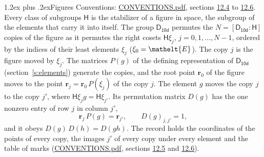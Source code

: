 \documentclass[10pt,a4paper]{article}
\makeatletter
\renewcommand\section{\@startsection{section}{1}{\z@}{-3ex plus -1ex minus -.2ex}%
  {1.2ex plus .2ex}{\normalfont\large\sffamily\bfseries\color{parttitle}}}
\numberwithin{equation}{section}
\newcommand{\eltfont}[1]{{\let\sigma\eltsigma\mathelt{#1}}}
\newcommand{\grp}[1]{\mathsf{#1}}
\newcommand{\cls}[1]{\eltfont{#1}}
\newcommand{\pointr}{\mathbf{r}}
\makeatother
\begin{document}
\section{Figures}\label{s:permutation}
Conventions: \href{../../CONVENTIONS.pdf}{CONVENTIONS.pdf}, sections \href{../../CONVENTIONS.pdf\#conv.12.4}{12.4} to \href{../../CONVENTIONS.pdf\#conv.12.6}{12.6}.
Every class of subgroups $\grp{H}$ is the stabilizer of a figure in space, the subgroup of the elements that carry it into itself. \label{n:local.orbit.size}\label{n:element.coset.least}\label{n:index.coset}The group $\grp{D_{10d}}$ permutes the $N = [\grp{D_{10d}} : \grp{H}]$ copies of the figure as it permutes the right cosets $\grp{H}\xi_j$, $j = 0, 1, \dots, N - 1$, ordered by the indices of their least elements $\xi_j$ ($\xi_0 = \cls{E}$). The copy $j$ is the figure moved by $\xi_j$. The matrices $P(g)$ of the defining representation of $\grp{D_{10d}}$ (section~\ref{s:elements}) generate the copies, and the root point $\pointr_0$ of the figure moves to the point $\pointr_j = \pointr_0\, P(\xi_j)$ of the copy $j$. \label{n:local.coset.image}The element $g$ moves the copy $j$ to the copy $j'$, where $\grp{H}\xi_j g = \grp{H}\xi_{j'}$. \label{n:local.matrix.permutation}Its permutation matrix $D(g)$ has the one nonzero entry of row $j$ in column $j'$,
\begin{equation}\label{e:perm.matrix}\pointr_j\, P(g) = \pointr_{j'}, \qquad D(g)_{j,j'} = 1,\end{equation}
and it obeys $D(g)\, D(h) = D(gh)$. The record holds the coordinates of the points of every copy, the images $j'$ of every copy under every element and the table of marks (\href{../../CONVENTIONS.pdf}{CONVENTIONS.pdf}, sections \href{../../CONVENTIONS.pdf\#conv.12.5}{12.5} and \href{../../CONVENTIONS.pdf\#conv.12.6}{12.6}).
\end{document}
